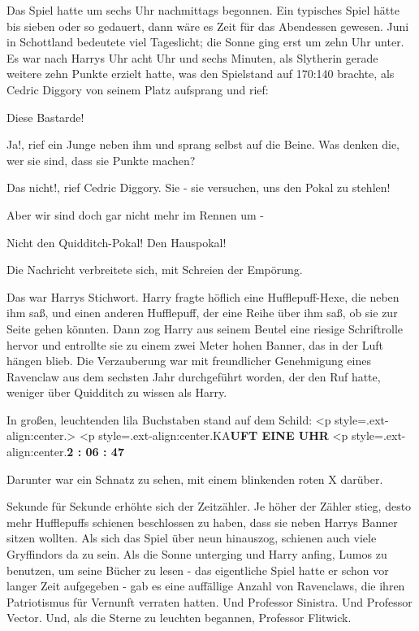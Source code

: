 Das Spiel hatte um sechs Uhr nachmittags begonnen. Ein typisches Spiel hätte bis
sieben oder so gedauert, dann wäre es Zeit für das Abendessen gewesen. Juni in
Schottland bedeutete viel Tageslicht; die Sonne ging erst um zehn Uhr unter. Es
war nach Harrys Uhr acht Uhr und sechs Minuten, als Slytherin gerade weitere
zehn Punkte erzielt hatte, was den Spielstand auf 170:140 brachte, als Cedric
Diggory von seinem Platz aufsprang und rief:

\glqq{}Diese Bastarde!\grqq{}

\glqq{}Ja!\grqq{}, rief ein Junge neben ihm und sprang selbst auf die Beine.
\glqq{}Was denken die, wer sie sind, dass sie Punkte machen?\grqq{}

\glqq{}Das nicht!\grqq{}, rief Cedric Diggory. \glqq{}Sie - sie versuchen, uns den
Pokal zu stehlen!\grqq{}

\glqq{}Aber wir sind doch gar nicht mehr im Rennen um -\grqq{}

\glqq{}Nicht den Quidditch-Pokal! Den Hauspokal!\grqq{}

Die Nachricht verbreitete sich, mit Schreien der Empörung.

Das war Harrys Stichwort. Harry fragte höflich eine Hufflepuff-Hexe, die neben
ihm saß, und einen anderen Hufflepuff, der eine Reihe über ihm saß, ob sie zur
Seite gehen könnten. Dann zog Harry aus seinem Beutel eine riesige Schriftrolle
hervor und entrollte sie zu einem zwei Meter hohen Banner, das in der Luft
hängen blieb. Die Verzauberung war mit freundlicher Genehmigung eines Ravenclaw
aus dem sechsten Jahr durchgeführt worden, der den Ruf hatte, weniger über
Quidditch zu wissen als Harry.

In großen, leuchtenden lila Buchstaben stand auf dem Schild: <p
style=\grqq{}.ext-align:center\grqq{}.> <p
style=\grqq{}.ext-align:center\grqq{}.KA\textbf{UFT EINE UHR}  <p
style=\grqq{}.ext-align:center\grqq{}.\textbf{2 : 06 : 47}

Darunter war ein Schnatz zu sehen, mit einem blinkenden roten X darüber.

Sekunde für Sekunde erhöhte sich der Zeitzähler. Je höher der Zähler stieg,
desto mehr Hufflepuffs schienen beschlossen zu haben, dass sie neben Harrys
Banner sitzen wollten. Als sich das Spiel über neun hinauszog, schienen auch
viele Gryffindors da zu sein. Als die Sonne unterging und Harry anfing, Lumos zu
benutzen, um seine Bücher zu lesen - das eigentliche Spiel hatte er schon vor
langer Zeit aufgegeben - gab es eine auffällige Anzahl von Ravenclaws, die ihren
Patriotismus für Vernunft verraten hatten. Und Professor Sinistra. Und Professor
Vector. Und, als die Sterne zu leuchten begannen, Professor Flitwick.

